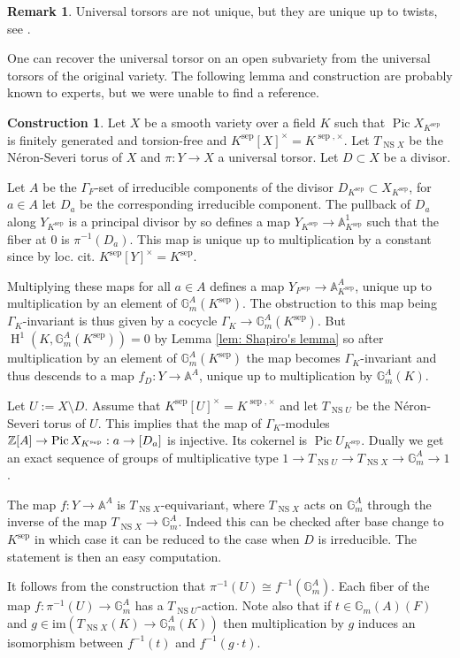 \documentclass[a4paper,11pt,reqno]{amsart}
\newcommand{\G}{\mathbb{G}}
\newcommand{\A}{\mathbb{A}}
\DeclareMathOperator{\Pic}{Pic}
\DeclareMathOperator{\NS}{NS}
\DeclareMathOperator{\HH}{H}
\DeclareMathOperator{\sep}{sep}
\theoremstyle{definition}
\newtheorem{remark}[theorem]{Remark}
\newtheorem{construction}[theorem]{Construction}
\begin{document}
\begin{remark}
	Universal torsors are not unique, but they are unique up to twists, see \cite[(2.22)]{Skorogobatov2001Torsors}.
\end{remark}
One can recover the universal torsor on an open subvariety from the universal torsors of the original variety. The following lemma and construction are probably known to experts, but we were unable to find a reference.
\begin{construction}\label{cons:Divisor map}
	Let $X$ be a smooth variety over a field $K$ such that $\Pic X_{K^{\sep}}$ is finitely generated and torsion-free and $K^{\sep}[X]^{\times} = K^{\sep, \times}$. Let $T_{\NS X}$ be the N\'eron-Severi torus of $X$ and $\pi: Y \to X$ a universal torsor. Let $D \subset X$ be a divisor.
	
	Let $A$ be the $\Gamma_F$-set of irreducible components of the divisor $D_{K^{\sep}} \subset X_{K^{\sep}}$, for $a \in A$ let $D_a$ be the corresponding irreducible component. The pullback of $D_a$ along $Y_{K^{\sep}}$ is a principal divisor by \cite[Prop.~2.1.1]{Colliot1987Descente} so defines a map $Y_{K^{\sep}} \to \A_{K^{\sep}}^1$ such that the fiber at $0$ is $\pi^{-1}(D_a)$. This map is unique up to multiplication by a constant since by loc. cit. $K^{\sep}[Y]^{\times} = K^{\sep}$.
	
	Multiplying these maps for all $a \in A$ defines a map $Y_{F^{\sep}} \to \A_{K^{\sep}}^A$, unique up to multiplication by an element of $\G_m^A(K^{\sep})$. The obstruction to this map being $\Gamma_K$-invariant is thus given by a cocycle $\Gamma_K \to \G_m^A(K^{\sep})$. But $\HH^1(K, \G_m^A(K^{\sep})) = 0$ by Lemma \ref{lem: Shapiro's lemma} so after multiplication by an element of $\G_m^A(K^{\sep})$ the map becomes $\Gamma_K$-invariant and thus descends to a map $f_D:Y \to \A^A$, unique up to multiplication by $\G_m^{A}(K)$. 
	
	 Let $U := X \setminus D$. Assume that $K^{\sep}[U]^{\times} = K^{\sep, \times}$ and let $T_{\NS U}$ be the N\'eron-Severi torus of $U$. This implies that the map of $\Gamma_K$-modules $\Z[A] \to \Pic X_{K^{\sep}}: a \to [D_a]$ is injective. Its cokernel is $\Pic U_{K^{\sep}}$. Dually we get an exact sequence of groups of multiplicative type $1 \to T_{\NS U} \to T_{\NS X} \to \G_m^A \to 1$.
	 
	 The map $f:Y \to \A^A$ is $T_{\NS X}$-equivariant, where $T_{\NS X}$ acts on $\G_m^A$ through the inverse of the map $T_{\NS X} \to \G_m^A$. Indeed this can be checked after base change to $K^{\sep}$ in which case it can be reduced to the case when $D$ is irreducible. The statement is then an easy computation.
	 
	It follows from the construction that $\pi^{-1}(U) \cong f^{-1}(\G_m^A)$. Each fiber of the map $f: \pi^{-1}(U) \to \G_m^{A}$ has a $T_{\NS U}$-action. Note also that if $t \in \G_m(A)(F)$ and $g \in \text{im}(T_{\NS X}(K) \to \G_m^A(K))$ then multiplication by $g$ induces an isomorphism between $f^{-1}(t)$ and $f^{-1}(g \cdot t)$.
\end{construction}
\end{document}
